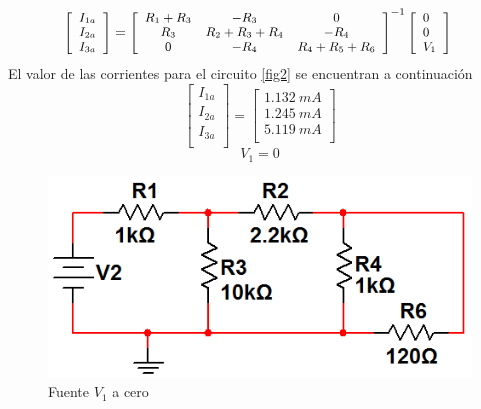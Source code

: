 \documentclass[twocolumn]{IEEEtran}
\begin{document}
\begin{equation}
\footnotesize
 \left[ \begin{array}{l}
 {I_{1a}} \\ 
 {I_{2a}} \\ 
 {I_{3a}} \\ 
 \end{array} \right] = {\left[ {\begin{array}{*{20}{c}}
   {{R_1} + {R_3}} & { - {R_3}} & 0  \\
   {{R_3}} & {{R_2} + {R_3} + {R_4}} & { - {R_4}}  \\
   0 & { - {R_4}} & {{R_4} + {R_5} + {R_6}}  \\
\end{array}} \right]^{ - 1}}\left[ \begin{array}{l}
 0 \\ 
 0 \\ 
 {V_1} \\ 
 \end{array} \right]\
\label{mat1}
\end{equation}
\noindent
El valor de las corrientes para el circuito \ref{fig2} se encuentran a continuación
\begin{equation}
 \left[ \begin{array}{l}
 {I_{1a}} \\ 
 {I_{2a}} \\ 
 {I_{3a}} \\ 
 \end{array} \right] = \left[ \begin{array}{l}
 1.132 \ mA\\ 
 1.245 \ mA\\ 
 5.119 \ mA\\ 
 \end{array} \right]
\end{equation}
$$V_1 = 0$$
\begin{figure}[H]
	\centering
		\includegraphics[scale=0.5]{c2.png}
	\caption{Fuente $V_1$ a cero}
	\label{fig3}
\end{figure}
\end{document}
